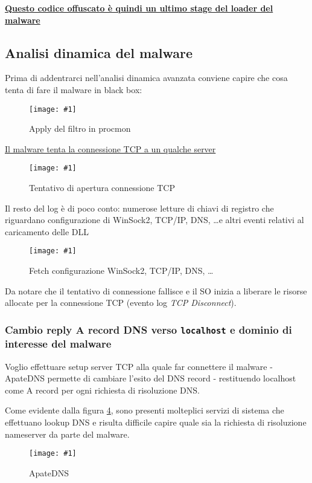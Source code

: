 \documentclass[
    a4paper, %
    11pt %
]{article}
\newcommand{\pic}[4]{\begin{figure}[H]
            \centering
            \texttt{[image: \#1]}
            \caption{#2}
            \label{fig:#1}
            \end{figure}}
\begin{document}
            \underline{\textbf{Questo codice offuscato è quindi un ultimo stage del loader del malware}}

            \pagebreak

            \subsection{Analisi dinamica del malware}

            Prima di addentrarci nell'analisi dinamica avanzata conviene capire che cosa tenta di fare
            il malware in black box:

            \pic{procmon_explorer_cmdline}{Apply del filtro in procmon}{15cm}{5cm}

            \underline{Il malware tenta la connessione TCP a un qualche server}
            \pic{procmon_explorer_interesting}{Tentativo di apertura connessione TCP}{18cm}{2cm}

            Il resto del log è di poco conto: numerose letture di chiavi di registro che riguardano
            configurazione di WinSock2, TCP/IP, DNS, \dots e altri eventi relativi al caricamento delle DLL
            \pic{procmon_explorer_notinteresting}{Fetch configurazione WinSock2, TCP/IP, DNS, \dots}{18cm}{7cm}

            Da notare che il tentativo di connessione fallisce e il SO inizia a liberare le risorse allocate
            per la connessione TCP (evento log \textit{TCP Disconnect}).

            \pagebreak
            
            \subsubsection{Cambio reply A record DNS verso \texttt{localhost} e dominio di interesse del malware}

            Voglio effettuare setup server TCP alla quale far connettere il malware - ApateDNS permette di
            cambiare l'esito del DNS record - restituendo localhost come A record per ogni richiesta di risoluzione DNS.

            Come evidente dalla figura \ref{fig:dnslookup}, sono presenti molteplici servizi di sistema che
            effettuano lookup DNS e risulta difficile capire quale sia la richiesta di risoluzione nameserver da 
            parte del malware.

            \pic{dnslookup}{ApateDNS}{16cm}{10cm}
\end{document}
